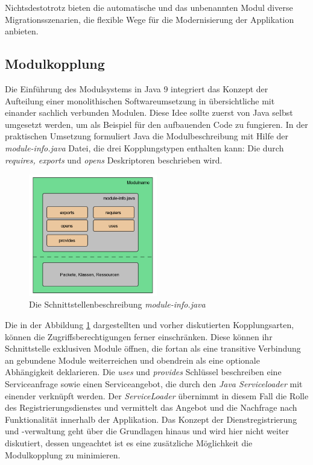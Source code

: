     Nichtsdestotrotz bieten die automatische und das unbenannten Modul diverse Migrationsszenarien, die flexible Wege für die Modernisierung der Applikation anbieten. 

  \subsection{Modulkopplung}
    Die Einführung des Modulsystems in Java 9 integriert das Konzept der Aufteilung einer monolithischen Softwareumsetzung in übersichtliche mit einander sachlich verbunden Modulen. 
    Diese Idee sollte zuerst von Java selbst umgesetzt werden, um als Beispiel für den aufbauenden Code zu fungieren.
    In der praktischen Umsetzung formuliert Java die Modulbeschreibung mit Hilfe der \textit{module-info.java} Datei, die drei Kopplungstypen enthalten kann: Die durch \textit{requires, exports} und \textit{opens} Deskriptoren beschrieben wird.

    \begin{figure}[h!]
      \centering
      \includegraphics[width=0.5\textwidth]{material/images/module-info.png}
      \caption{Die Schnittstellenbeschreibung \textit{module-info.java}}
      \label{fig:module-info}
    \end{figure}

    Die in der Abbildung \ref{fig:module-info} dargestellten und vorher diskutierten Kopplungsarten, können die Zugriffsberechtigungen ferner einschränken. Diese können ihr Schnittstelle exklusiven Module öffnen, die fortan als eine transitive Verbindung an gebundene Module weiterreichen und obendrein als eine optionale Abhängigkeit deklarieren. Die \textit{uses} und \textit{provides} Schlüssel beschreiben eine Serviceanfrage sowie einen Serviceangebot, die durch den \textit{Java Serviceloader} mit einender verknüpft werden.
    Der \textit{ServiceLoader} übernimmt in diesem Fall die Rolle des Registrierungsdienstes und vermittelt das Angebot und die Nachfrage nach Funktionalität innerhalb der Applikation. Das Konzept der Dienstregistrierung und -verwaltung geht über die Grundlagen hinaus und wird hier nicht weiter diskutiert, dessen ungeachtet ist es eine zusätzliche Möglichkeit die Modulkopplung zu minimieren. \bigbreak
    
